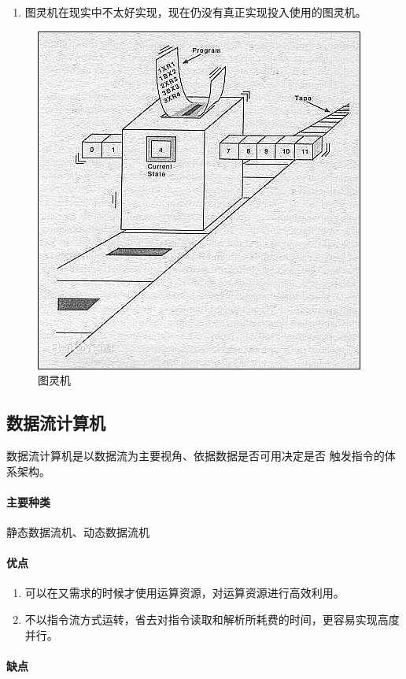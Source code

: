 \documentclass[UTF8]{ctexart}
\begin{document}
\begin{enumerate}
    \item 图灵机在现实中不太好实现，现在仍没有真正实现投入使用的图灵机。
\end{enumerate}

\begin{figure}[H]
\centering
\includegraphics[width=.6\textwidth]{./pics/8.jpg}
\caption{图灵机}
\end{figure}

\subsection{数据流计算机}

数据流计算机是以数据流为主要视角、依据数据是否可用决定是否
触发指令的体系架构。

\paragraph*{主要种类}

静态数据流机、动态数据流机

\paragraph*{优点}

\begin{enumerate}
    \item 可以在又需求的时候才使用运算资源，对运算资源进行高效利用。
    \item 不以指令流方式运转，省去对指令读取和解析所耗费的时间，更容易实现高度并行。
\end{enumerate}

\paragraph*{缺点}
\end{document}
